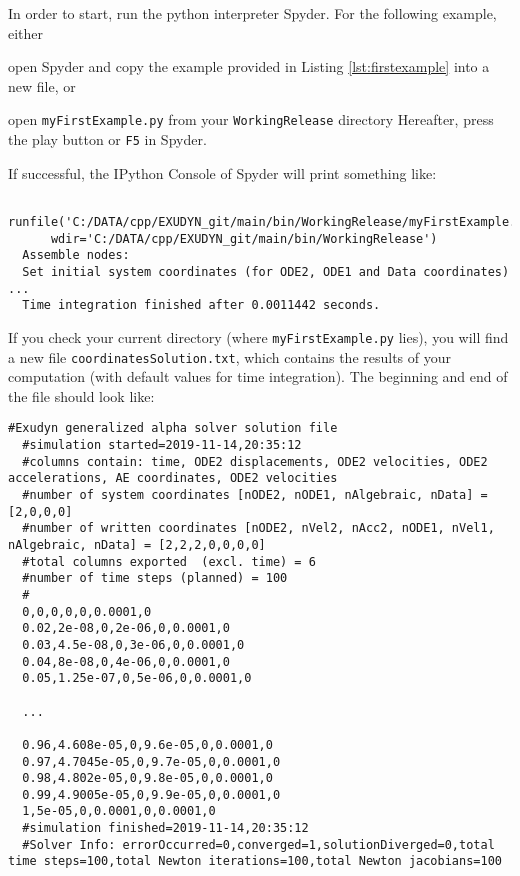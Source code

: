 In order to start, run the python interpreter Spyder.
For the following example, either 
\bi
	\item open Spyder and copy the example provided in Listing \ref{lst:firstexample} into a new file, or
	\item open \texttt{myFirstExample.py} from your \texttt{WorkingRelease} directory
\ei
Hereafter, press the play button or \texttt{F5} in Spyder.
%

If successful, the IPython Console of Spyder will print something like:
\plainlststyle
{\ttfamily \footnotesize
\begin{lstlisting}
  runfile('C:/DATA/cpp/EXUDYN_git/main/bin/WorkingRelease/myFirstExample.py', 
	  wdir='C:/DATA/cpp/EXUDYN_git/main/bin/WorkingRelease')
  Assemble nodes:
  Set initial system coordinates (for ODE2, ODE1 and Data coordinates) ...
  Time integration finished after 0.0011442 seconds.
\end{lstlisting}
}

If you check your current directory (where \texttt{myFirstExample.py} lies), you will find a new file \texttt{coordinatesSolution.txt}, which contains the results of your computation (with default values for time integration).
The beginning and end of the file should look like: \vspace{6pt}\\
{\ttfamily \footnotesize
\begin{lstlisting}[breaklines=true]
  #Exudyn generalized alpha solver solution file
  #simulation started=2019-11-14,20:35:12
  #columns contain: time, ODE2 displacements, ODE2 velocities, ODE2 accelerations, AE coordinates, ODE2 velocities
  #number of system coordinates [nODE2, nODE1, nAlgebraic, nData] = [2,0,0,0]
  #number of written coordinates [nODE2, nVel2, nAcc2, nODE1, nVel1, nAlgebraic, nData] = [2,2,2,0,0,0,0]
  #total columns exported  (excl. time) = 6
  #number of time steps (planned) = 100
  #
  0,0,0,0,0,0.0001,0
  0.02,2e-08,0,2e-06,0,0.0001,0
  0.03,4.5e-08,0,3e-06,0,0.0001,0
  0.04,8e-08,0,4e-06,0,0.0001,0
  0.05,1.25e-07,0,5e-06,0,0.0001,0

  ...

  0.96,4.608e-05,0,9.6e-05,0,0.0001,0
  0.97,4.7045e-05,0,9.7e-05,0,0.0001,0
  0.98,4.802e-05,0,9.8e-05,0,0.0001,0
  0.99,4.9005e-05,0,9.9e-05,0,0.0001,0
  1,5e-05,0,0.0001,0,0.0001,0
  #simulation finished=2019-11-14,20:35:12
  #Solver Info: errorOccurred=0,converged=1,solutionDiverged=0,total time steps=100,total Newton iterations=100,total Newton jacobians=100
\end{lstlisting}
}

